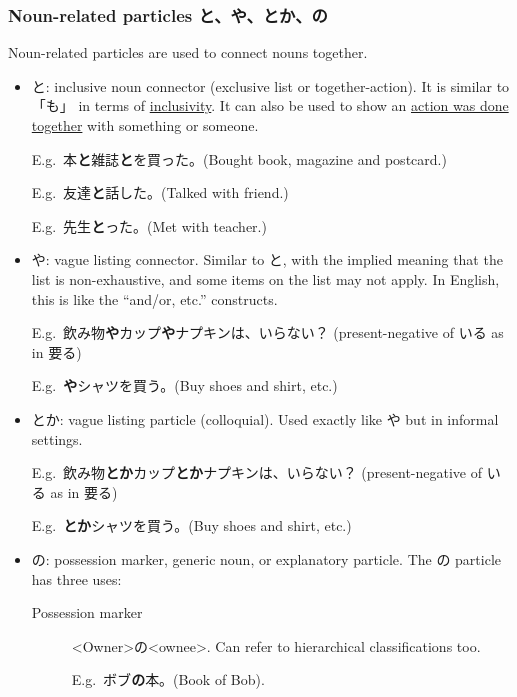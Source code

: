 \documentclass[../nihongo-gakushuu-kyouzai.tex]{subfiles}
\begin{document}
\subsubsection{Noun-related particles と、や、とか、の}\label{sec:noun-related-particles}
Noun-related particles are used to connect nouns together.
\begin{itemize}
    \item と: inclusive noun connector (exclusive list or together-action).  It is similar to 「も」 in terms of \ul{inclusivity}. It can also be used to show an \ul{action was done together} with something or someone.

    E.g.\ 本\textbf{と}雑誌\textbf{と}を買った。(Bought book, magazine and postcard.)

    E.g.\ 友達\textbf{と}話した。(Talked with friend.)

    E.g.\ 先生\textbf{と}った。(Met with teacher.)
    \item や: vague listing connector. Similar to と,  with the implied meaning that the list is non-exhaustive, and some items on the list may not apply. In English, this is like the ``and/or, etc.'' constructs.

    E.g.\ 飲み物\textbf{や}カップ\textbf{や}ナプキンは、いらない？ (present-negative of いる as in 要る)

    E.g.\ \textbf{や}シャツを買う。(Buy shoes and shirt, etc.)
    \item とか: vague listing particle (colloquial). Used exactly like や but in informal settings. 

    E.g.\ 飲み物\textbf{とか}カップ\textbf{とか}ナプキンは、いらない？ (present-negative of いる as in 要る)

    E.g.\ \textbf{とか}シャツを買う。(Buy shoes and shirt, etc.)
    \item の: possession marker, generic noun, or explanatory particle. The の particle has three uses:
    \begin{description}
        \item[Possession marker] <Owner>の<ownee>. Can refer to hierarchical classifications too.

        E.g.\ ボブ\textbf{の}本。(Book of Bob).


\end{description}
\end{itemize}
\end{document}
